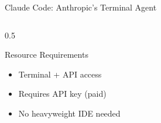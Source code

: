 \documentclass[aspectratio=169,11pt]{beamer}
\begin{document}
\begin{frame}{Claude Code: Anthropic's Terminal Agent}
\begin{columns}[T]
\begin{column}{0.5\textwidth}
            \begin{block}{Resource Requirements}
                \begin{itemize}
                    \item Terminal + API access
                    \item Requires API key (paid)
                    \item No heavyweight IDE needed
                \end{itemize}
            \end{block}
        \end{column}
    \end{columns}

\end{frame}
\end{document}
